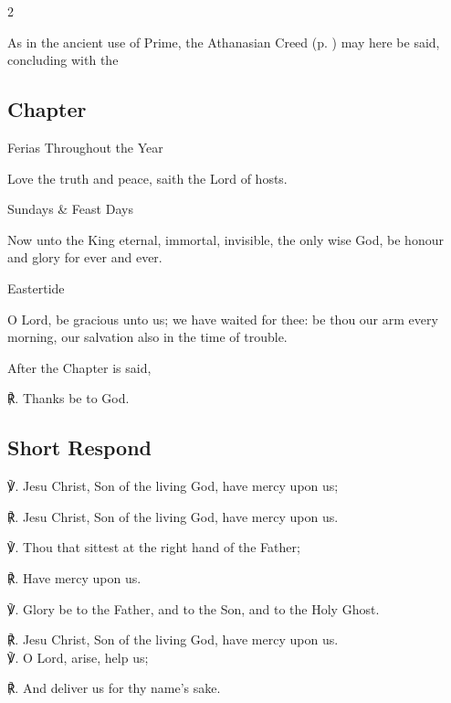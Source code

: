 \begin{multicols}{2}
\begin{rubric}
    As in the ancient use of Prime, the Athanasian Creed (p. \pageref{Ath}) may here be said, concluding with the 
\end{rubric}

\subsection{Chapter}

\begin{inhead}
	Ferias Throughout the Year
\end{inhead}\par\noindent
Love the truth and peace, saith the Lord of hosts.

\begin{inhead}
	Sundays \& Feast Days
\end{inhead}\par\noindent
Now unto the King eternal, immortal, invisible, the only wise God, be honour and glory for ever and ever.

\begin{inhead}
	Eastertide
\end{inhead}\par\noindent
O Lord, be gracious unto us; we have waited for thee: be thou our arm every morning, our salvation also in the time of trouble.

\begin{rubric}
	After the Chapter is said,
\end{rubric}
℟. Thanks be to God.

\subsection{Short Respond}
℣. Jesu Christ, Son of the living God, have mercy upon us;

℟. Jesu Christ, Son of the living God, have mercy upon us.

℣. Thou that sittest at the right hand of the Father;

℟. Have mercy upon us.

℣. Glory be to the Father, and to the Son, and to the Holy Ghost.

℟. Jesu Christ, Son of the living God, have mercy upon us.\\

℣. O Lord, arise, help us;

℟. And deliver us for thy name's sake.


\end{multicols}
